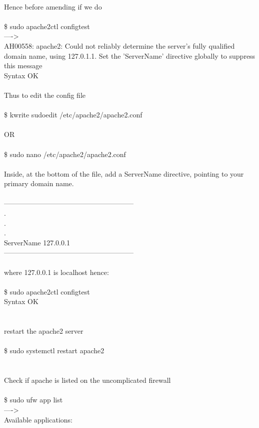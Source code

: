 \documentclass[10pt,a4paper]{article}
\begin{document}
{{{{{{{{{{{{{{{{{{\\
Hence before amending if we do\\
\\
\$ sudo apache2ctl configtest \\
---->\\
AH00558: apache2: Could not reliably determine the server's fully qualified domain name, using 127.0.1.1. Set the 'ServerName' directive globally to suppress this message}{\large \\
Syntax OK\\
\\
Thus to edit the config file\\
\\
\$ kwrite sudoedit /etc/apache2/apache2.conf}{\large \\
\\
OR\\
\\
\$ sudo nano /etc/apache2/apache2.conf}{\large \\
\\
Inside, at the bottom of the file, add a ServerName directive, pointing to your primary domain name. \\
\\
--------------------------------------------------------\\
.\\
.\\
.\\
ServerName 127.0.0.1\\
--------------------------------------------------------\\
\\
where 127.0.0.1 is localhost  hence:\\
\\
\$ sudo apache2ctl configtest\\
Syntax OK\\
\\
\\
restart the apache2 server\\
\\
\$ sudo systemctl restart apache2\\
\\
\\
Check if apache is listed on the uncomplicated firewall\\
\\
\$ sudo ufw app list\\
---->\\
Available applications:\\
}}}}}}}}}}}}}}}}}}
\end{document}

